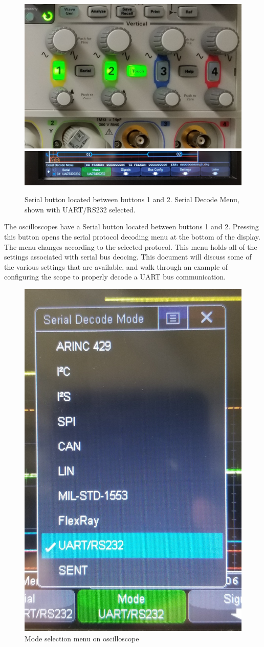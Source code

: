 \documentclass{article}
\begin{document}
  \begin{figure}
    \includegraphics[width=44ex]{images/uart/serial_button_scope.jpg}
    \includegraphics[width=44ex]{images/uart/serial_decode_scope.jpg}
    \caption{Serial button located between buttons 1 and 2. Serial Decode Menu,
      shown with UART/RS232 selected.}
  \end{figure}

  The oscilloscopes have a Serial button located between buttons 1 and 2.
  Pressing this button opens the serial protocol decoding menu at the bottom of
  the display. The menu changes according to the selected protocol. This menu
  holds all of the settings associated with serial bus deocing. This
  document will discuss some of the various settings that are available, and
  walk through an example of configuring the scope to properly decode a UART bus
  communication.

  \begin{figure}
    \includegraphics[width=25ex]{images/uart/mode_menu.jpg}
    \caption{Mode selection menu on oscilloscope}
    \label{fig:uart_mode_menu}
  \end{figure}
\end{document}
